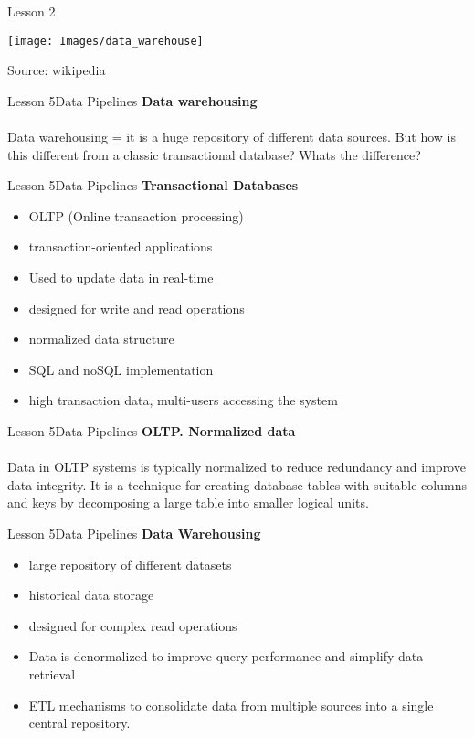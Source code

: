 \documentclass[aspectratio=1610]{beamer}
\begin{document}
\begin{frame}{Lesson 2}{}
\begin{center}
	\texttt{[image: Images/data\_warehouse]}
\end{center}
Source: wikipedia
\end{frame}



\begin{frame}{Lesson 5}{Data Pipelines}
\LARGE
\textbf{Data warehousing}\\~\\
Data warehousing = it is a huge repository of different data sources.
But how is this different from a classic transactional database? Whats the 
difference?
\end{frame}



\begin{frame}{Lesson 5}{Data Pipelines}
\LARGE
\textbf{Transactional Databases}\\
\begin{itemize}
	\item OLTP (Online transaction processing)
	\item transaction-oriented applications
	\item Used to update data in real-time
	\item designed for write and read operations
	\item normalized data structure
	\item SQL and noSQL implementation
	\item high transaction data, multi-users accessing the system
\end{itemize}
\end{frame}


\begin{frame}{Lesson 5}{Data Pipelines}
\LARGE
\textbf{OLTP. Normalized data}\\~\\
Data in OLTP systems is typically normalized to reduce redundancy and improve 
data integrity. It is a technique for creating database tables with suitable 
columns and keys by decomposing a large table into smaller logical units.
\end{frame}


\begin{frame}{Lesson 5}{Data Pipelines}
\LARGE
\textbf{Data Warehousing}\\
\begin{itemize}
	\item large repository of different datasets
	\item historical data storage
	\item designed for complex read operations
	\item Data is denormalized to improve query performance and simplify data retrieval
	\item ETL mechanisms to consolidate data from multiple sources into a single central repository.
\end{itemize}
\end{frame}
\end{document}
